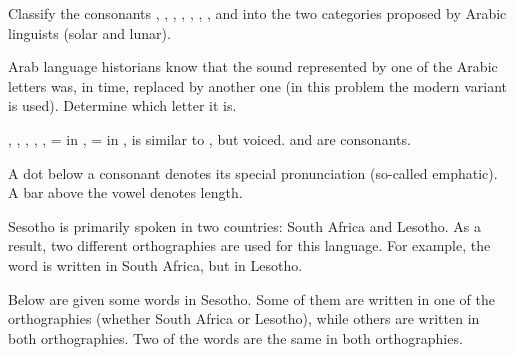 \begin{refsection}
\begin{problem}{\langnameArabic}{\nameASomin}{\ElementyAbbr}
\begin{assgts}
\item Classify the consonants , , , , , , ,  and  into the two categories proposed by Arabic linguists (solar and lunar). 
\item Arab language historians know that the sound represented by one of the Arabic letters was, in time, replaced by another one (in this problem the modern variant is used). Determine which letter it is.
\end{assgts}

\begin{tblsWarning}
, , , , ,  =  in ,  =  in ,  is similar to , but voiced.  and  are consonants. 

A dot below a consonant denotes its special pronunciation (so-called \-emphat\-ic). A bar above the vowel denotes length.
\end{tblsWarning}

\end{problem}

\begin{problem}{\langnameSesotho}{\nameTKrashtan}{}
Sesotho is primarily spoken in two countries: South Africa and Lesotho. As a result, two different orthographies are used for this language. For example, the word  is written  in South Africa, but  in Lesotho.

Below are given some words in Sesotho. Some of them are written in one of the orthographies (whether South Africa or Lesotho), while others are written in both orthographies. Two of the words are the same in both orthographies. 

\begin{exe}
    \begin{multicols}{4}
        \sn[]{\hphantom{a}        }
    \end{multicols}
\end{exe}



\end{problem}
\end{refsection}
